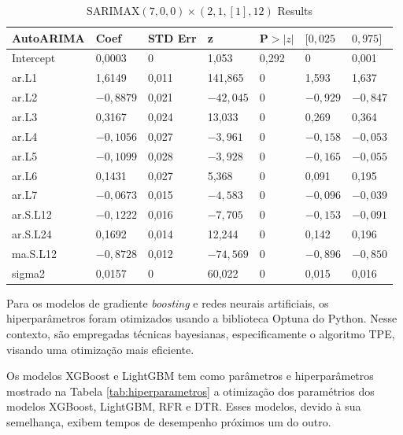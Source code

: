 \begin{table}[!htb]
	\centering
	\caption{SARIMAX$(7, 0, 0)\times(2, 1, [1], 12)$ Results} \label{tb:resltsar}
	\begin{tabular}{lllllll}
		\toprule
		\textbf{AutoARIMA} & \textbf{Coef} & \textbf{STD Err} & \textbf{z} & \textbf{P$>|z|$} & {$[0,025$} & {$0,975]$} \\
		\midrule
		Intercept & 0,0003 & 0 & 1,053 & 0,292 & 0 & 0,001 \\
		ar.L1 & 1,6149 & 0,011 & 141,865 & 0 & 1,593 & 1,637 \\
		ar.L2 & $-0,8879$ & 0,021 & $-42,045$ & 0 & $-0,929$ & $-0,847$ \\
		ar.L3 & 0,3167 & 0,024 & 13,033 & 0 & 0,269 & 0,364 \\
		ar.L4 & $-0,1056$ & 0,027 & $-3,961$ & 0 & $-0,158$ & $-0,053$ \\
		ar.L5 & $-0,1099$ & 0,028 & $-3,928$ & 0 & $-0,165$ & $-0,055$ \\
		ar.L6 & 0,1431 & 0,027 & 5,368 & 0 & 0,091 & 0,195 \\
		ar.L7 & $-0,0673$ & 0,015 & $-4,583$ & 0 & $-0,096$ & $-0,039$ \\
		ar.S.L12 & $-0,1222$ & 0,016 & $-7,705$ & 0 & $-0,153$ & $-0,091$ \\
		ar.S.L24 & 0,1692 & 0,014 & 12,244 & 0 & 0,142 & 0,196 \\
		ma.S.L12 & $-0,8728$ & 0,012 & $-74,569$ & 0 & $-0,896$ & $-0,850$ \\
		sigma2 & 0,0157 & 0 & 60,022 & 0 & 0,015 & 0,016 \\
		\bottomrule
	\end{tabular}
\end{table}


Para os modelos de gradiente \textit{boosting} e redes neurais artificiais, os hiperparâmetros foram otimizados usando a biblioteca Optuna do Python. Nesse contexto, são empregadas técnicas bayesianas, especificamente o algoritmo TPE, visando uma otimização mais eficiente.

Os modelos XGBoost e LightGBM tem como parâmetros e hiperparâmetros mostrado na Tabela \ref{tab:hiperparametros} a otimização dos paramétrios dos modelos XGBoost, LightGBM, RFR e DTR. Esses modelos, devido à sua semelhança, exibem tempos de desempenho próximos um do outro. 



